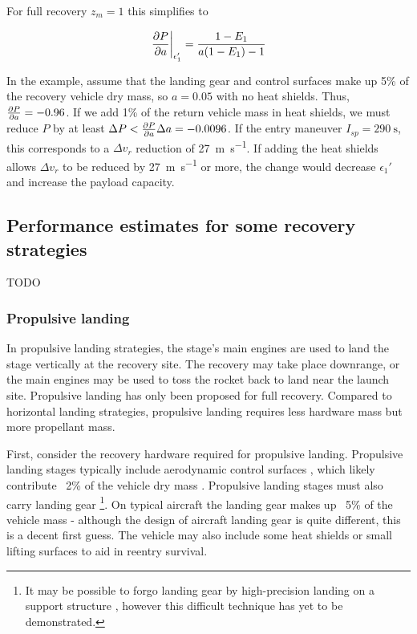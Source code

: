 \documentclass[conf]{new-aiaa}
\begin{document}
For full recovery $z_m=1$ this simplifies to

\begin{equation}
\left. \pdv{P}{a} \right|_{\epsilon_1'} = \frac{1 - E_1}{a(1 -E_1) - 1}
\end{equation}

In the example, assume that the landing gear and control surfaces make up 5\% of the recovery vehicle dry mass, so $a=0.05$ with no heat shields. Thus, $ \pdv{P}{a} = -0.96$. If we add 1\% of the return vehicle mass in heat shields, we must reduce $P$ by at least $\Delta P < \pdv{P}{a} \Delta a = -0.0096$. If the entry maneuver $I_{sp} = \SI{290}{\second}$, this corresponds to a $\Delta v_r$ reduction of \SI{27}{\meter\per\second}. If adding the heat shields allows $\Delta v_r$ to be reduced by \SI{27}{\meter\per\second} or more, the change would decrease $\epsilon_1'$ and increase the payload capacity.


\subsection{Performance estimates for some recovery strategies}
TODO

\subsubsection{Propulsive landing}
In propulsive landing strategies, the stage's main engines are used to land the stage vertically at the recovery site. The recovery may take place downrange, or the main engines may be used to toss the rocket back to land near the launch site. Propulsive landing has only been proposed for full recovery. Compared to horizontal landing strategies, propulsive landing requires less hardware mass but more propellant mass.

First, consider the recovery hardware required for propulsive landing. Propulsive landing stages typically include aerodynamic control surfaces \cite{NewGlenn, Falcon9, DCX, Musk2017}, which likely contribute ~2\% of the vehicle dry mass \cite{Sforza2015}. Propulsive landing stages must also carry landing gear \footnote{It may be possible to forgo landing gear by high-precision landing on a support structure \cite{Musk2017}, however this difficult technique has yet to be demonstrated.}. On typical aircraft the landing gear makes up ~5\% of the vehicle mass \cite{Sforza2015} - although the design of aircraft landing gear is quite different, this is a decent first guess. The vehicle may also include some heat shields or small lifting surfaces to aid in reentry survival.
\end{document}
